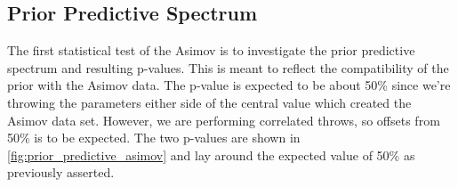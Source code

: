 
\subsection{Prior Predictive Spectrum}
\label{sec:Asimov_prior}
The first statistical test of the Asimov is to investigate the prior predictive spectrum and resulting p-values. This is meant to reflect the compatibility of the prior with the Asimov data. The p-value is expected to be about 50\% since we're throwing the parameters either side of the central value which created the Asimov data set. However, we are performing correlated throws, so offsets from 50\% is to be expected. The two p-values are shown in \autoref{fig:prior_predictive_asimov} and lay around the expected value of 50\% as previously asserted.

